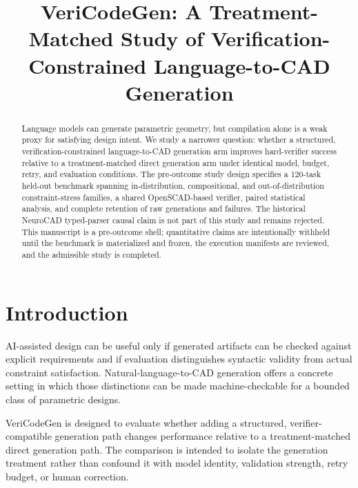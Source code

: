 \documentclass[conference]{IEEEtran}
\title{VeriCodeGen: A Treatment-Matched Study of Verification-Constrained Language-to-CAD Generation}
\author{\IEEEauthorblockN{Anonymous Authors}}
\begin{document}
\maketitle

\begin{abstract}
Language models can generate parametric geometry, but compilation alone is a weak proxy for satisfying design intent. We study a narrower question: whether a structured, verification-constrained language-to-CAD generation arm improves hard-verifier success relative to a treatment-matched direct generation arm under identical model, budget, retry, and evaluation conditions. The pre-outcome study design specifies a 120-task held-out benchmark spanning in-distribution, compositional, and out-of-distribution constraint-stress families, a shared OpenSCAD-based verifier, paired statistical analysis, and complete retention of raw generations and failures. The historical NeuroCAD typed-parser causal claim is not part of this study and remains rejected. This manuscript is a pre-outcome shell; quantitative claims are intentionally withheld until the benchmark is materialized and frozen, the execution manifests are reviewed, and the admissible study is completed.
\end{abstract}

\section{Introduction}
AI-assisted design can be useful only if generated artifacts can be checked against explicit requirements and if evaluation distinguishes syntactic validity from actual constraint satisfaction. Natural-language-to-CAD generation offers a concrete setting in which those distinctions can be made machine-checkable for a bounded class of parametric designs.

VeriCodeGen is designed to evaluate whether adding a structured, verifier-compatible generation path changes performance relative to a treatment-matched direct generation path. The comparison is intended to isolate the generation treatment rather than confound it with model identity, validation strength, retry budget, or human correction.
\end{document}
